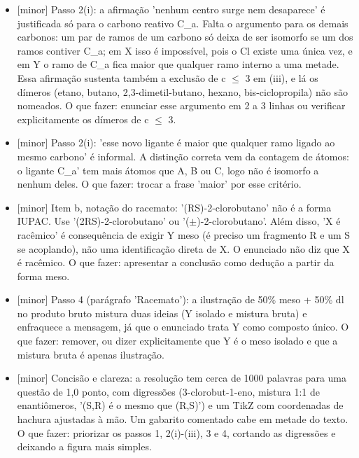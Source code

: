 \documentclass{article}%
\begin{document}
\begin{itemize}%
\item%
{[}minor{]} Passo 2(i): a afirmação 'nenhum centro surge nem desaparece' é justificada só para o carbono reativo C\_a. Falta o argumento para os demais carbonos: um par de ramos de um carbono só deixa de ser isomorfo se um dos ramos contiver C\_a; em X isso é impossível, pois o Cl existe uma única vez, e em Y o ramo de C\_a fica maior que qualquer ramo interno a uma metade. Essa afirmação sustenta também a exclusão de c $\leq$ 3 em (iii), e lá os dímeros (etano, butano, 2,3{-}dimetil{-}butano, hexano, bis{-}ciclopropila) não são nomeados. O que fazer: enunciar esse argumento em 2 a 3 linhas ou verificar explicitamente os dímeros de c $\leq$ 3.%
\item%
{[}minor{]} Passo 2(i): 'esse novo ligante é maior que qualquer ramo ligado ao mesmo carbono' é informal. A distinção correta vem da contagem de átomos: o ligante C\_a' tem mais átomos que A, B ou C, logo não é isomorfo a nenhum deles. O que fazer: trocar a frase 'maior' por esse critério.%
\item%
{[}minor{]} Item b, notação do racemato: '(RS){-}2{-}clorobutano' não é a forma IUPAC. Use '(2RS){-}2{-}clorobutano' ou '($\pm$){-}2{-}clorobutano'. Além disso, 'X é racêmico' é consequência de exigir Y meso (é preciso um fragmento R e um S se acoplando), não uma identificação direta de X. O enunciado não diz que X é racêmico. O que fazer: apresentar a conclusão como dedução a partir da forma meso.%
\item%
{[}minor{]} Passo 4 (parágrafo 'Racemato'): a ilustração de 50\% meso + 50\% dl no produto bruto mistura duas ideias (Y isolado e mistura bruta) e enfraquece a mensagem, já que o enunciado trata Y como composto único. O que fazer: remover, ou dizer explicitamente que Y é o meso isolado e que a mistura bruta é apenas ilustração.%
\item%
{[}minor{]} Concisão e clareza: a resolução tem cerca de 1000 palavras para uma questão de 1,0 ponto, com digressões (3{-}clorobut{-}1{-}eno, mistura 1:1 de enantiômeros, '(S,R) é o mesmo que (R,S)') e um TikZ com coordenadas de hachura ajustadas à mão. Um gabarito comentado cabe em metade do texto. O que fazer: priorizar os passos 1, 2(i){-}(iii), 3 e 4, cortando as digressões e deixando a figura mais simples.%
\end{itemize}%
\end{document}
